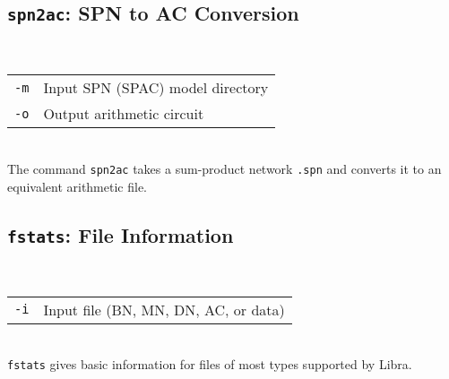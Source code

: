 \documentclass[11pt]{article}
\begin{document}
\subsection{{\tt spn2ac}: SPN to AC Conversion} \label{sec:spn2ac}


\noindent {} \\
\begin{tabular}{ll}
{\tt -m} &      Input SPN (SPAC) model directory \\
{\tt -o} &      Output arithmetic circuit
\end{tabular} \\

The command {\tt spn2ac} takes a sum-product network {\tt .spn} and
converts it to an equivalent arithmetic file.

\subsection{{\tt fstats}: File Information} \label{sec:fstats}


\noindent {} \\
\begin{tabular}{ll}
{\tt -i} &      Input file (BN, MN, DN, AC, or data) \\
\end{tabular} \\

{\tt fstats} gives basic information for files of most types supported
by Libra.

\newpage



\end{document}
